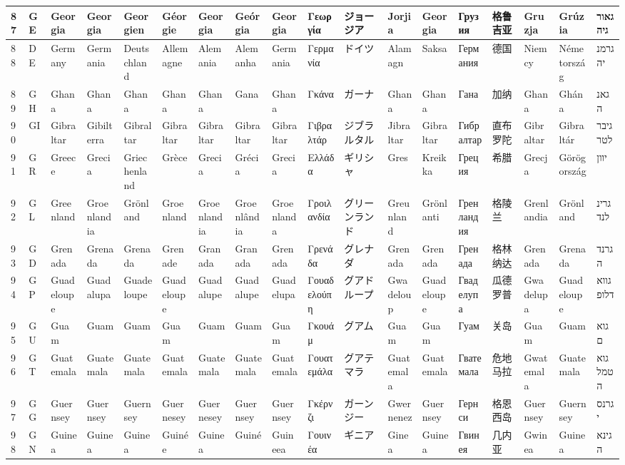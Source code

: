 \begin{longtable}{|l|l|l|l|l|l|l|l|l|l|l|l|l|l|l|l|l|l|}
87 & GE & Georgia & Georgia & Georgien & Géorgie & Georgia & Geórgia & Georgia & Γεωργία & ジョージア & Jorjia & Georgia & Грузия & 格鲁吉亚 & Gruzja & Grúzia & גאורגיה \\ \hline 
88 & DE & Germany & Germania & Deutschland & Allemagne & Alemania & Alemanha & Germania & Γερμανία & ドイツ & Alamagn & Saksa & Германия & 德国 & Niemcy & Németország & גרמניה \\ \hline 
89 & GH & Ghana & Ghana & Ghana & Ghana & Ghana & Gana & Ghana & Γκάνα & ガーナ & Ghana & Ghana & Гана & 加纳 & Ghana & Ghána & גאנה \\ \hline 
90 & GI & Gibraltar & Gibilterra & Gibraltar & Gibraltar & Gibraltar & Gibraltar & Gibraltar & Γιβραλτάρ & ジブラルタル & Jibraltar & Gibraltar & Гибралтар & 直布罗陀 & Gibraltar & Gibraltár & גיברלטר \\ \hline 
91 & GR & Greece & Grecia & Griechenland & Grèce & Grecia & Grécia & Grecia & Ελλάδα & ギリシャ & Gres & Kreikka & Греция & 希腊 & Grecja & Görögország & יוון \\ \hline 
92 & GL & Greenland & Groenlandia & Grönland & Groenland & Groenlandia & Groenlândia & Groenlanda & Γροιλανδία & グリーンランド & Greunland & Grönlanti & Гренландия & 格陵兰 & Grenlandia & Grönland & גרינלנד \\ \hline 
93 & GD & Grenada & Grenada & Grenada & Grenade & Granada & Granada & Grenada & Γρενάδα & グレナダ & Grenada & Grenada & Гренада & 格林纳达 & Grenada & Grenada & גרנדה \\ \hline 
94 & GP & Guadeloupe & Guadalupa & Guadeloupe & Guadeloupe & Guadalupe & Guadalupe & Guadelupa & Γουαδελούπη & グアドループ & Gwadeloup & Guadeloupe & Гваделупа & 瓜德罗普 & Gwadelupa & Guadeloupe & גוואדלופ \\ \hline 
95 & GU & Guam & Guam & Guam & Guam & Guam & Guam & Guam & Γκουάμ & グアム & Guam & Guam & Гуам & 关岛 & Guam & Guam & גואם \\ \hline 
96 & GT & Guatemala & Guatemala & Guatemala & Guatemala & Guatemala & Guatemala & Guatemala & Γουατεμάλα & グアテマラ & Guatemala & Guatemala & Гватемала & 危地马拉 & Gwatemala & Guatemala & גואטמלה \\ \hline 
97 & GG & Guernsey & Guernsey & Guernsey & Guernesey & Guernesey & Guernsey & Guernsey & Γκέρνζι & ガーンジー & Gwernenez & Guernsey & Гернси & 格恩西岛 & Guernsey & Guernsey & גרנסי \\ \hline 
98 & GN & Guinea & Guinea & Guinea & Guinée & Guinea & Guiné & Guineea & Γουινέα & ギニア & Ginea & Guinea & Гвинея & 几内亚 & Gwinea & Guinea & גינאה \\ \hline 

\end{longtable}
